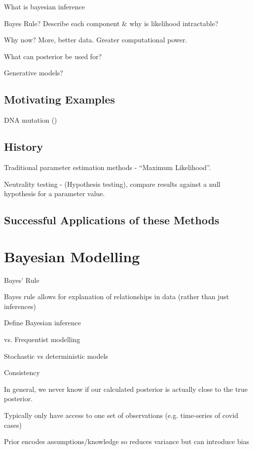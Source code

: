 \documentclass[bibliography=totoc,11pt,a4paper,margin=0]{article}
\theoremstyle{break}
\begin{document}
  \par What is bayesian inference
  \par Bayes Rule? Describe each component \& why is likelihood intractable?
  \par Why now? More, better data. Greater computational power.
  \par What can posterior be used for?
  \par Generative models?

\subsection*{Motivating Examples}\label{sec_motivating_examples}

  \par DNA mutation (\cite[]{modern_computational_approaches_for_analysing_molecular_genetic_variation_data})

\subsection*{History}\label{sec_history}

  \par Traditional parameter estimation methods - ``Maximum Likelihood''.
  \par Neutrality testing - (Hypothesis testing), compare results against a null hypothesis for a parameter value.

\subsection*{Successful Applications of these Methods}\label{sec_successful_applications}

\newpage
\section{Bayesian Modelling}

  \par Bayes' Rule
  \par Bayes rule allows for explanation of relationships in data (rather than just inferences)
  \par Define Bayesian inference
  \par vs. Frequentist modelling
  \par Stochastic vs deterministic models
  \par Consistency
  \par In general, we never know if our calculated posterior is actually close to the true posterior.
  \par Typically only have access to one set of observations (e.g. time-series of covid cases)
  \par Prior encodes assumptions/knowledge so reduces variance but can introduce bias
\end{document}
